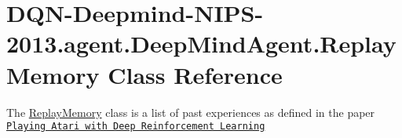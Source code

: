 \hypertarget{classDQN-Deepmind-NIPS-2013_1_1agent_1_1DeepMindAgent_1_1ReplayMemory}{}\section{D\+Q\+N-\/\+Deepmind-\/\+N\+I\+P\+S-\/2013.agent.\+Deep\+Mind\+Agent.\+Replay\+Memory Class Reference}
\label{classDQN-Deepmind-NIPS-2013_1_1agent_1_1DeepMindAgent_1_1ReplayMemory}


The \hyperlink{classDQN-Deepmind-NIPS-2013_1_1agent_1_1DeepMindAgent_1_1ReplayMemory}{Replay\+Memory} class is a list of past experiences as defined in the paper \href{https://www.cs.toronto.edu/~vmnih/docs/dqn.pdf}{\tt Playing Atari with Deep Reinforcement Learning}  



